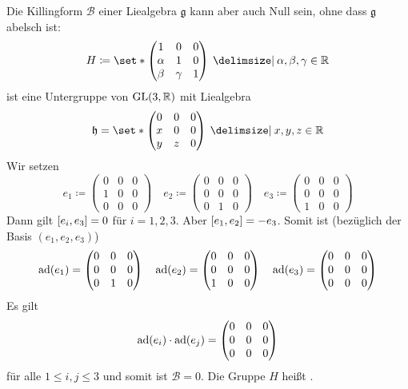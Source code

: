 Die Killingform $\mathcal{B}$ einer Liealgebra $\mathfrak{g}$ kann aber auch Null sein, ohne dass $\mathfrak{g}$ abelsch ist: 
\[
	H \coloneqq \set*{\begin{pmatrix}
		1 & 0 & 0 \\
		\alpha & 1 & 0 \\
		\beta & \gamma & 1
	\end{pmatrix} \given \alpha,\beta,\gamma \in \mathbb{R}}
\]
ist eine Untergruppe von $\GL(3,\mathbb{R})$ mit Liealgebra
\[
	\mathfrak{h} = \set*{\begin{pmatrix}
		0 & 0 & 0 \\
		x & 0 & 0 \\
		y & z & 0
	\end{pmatrix} \given x,y,z \in \mathbb{R}}
\]
Wir setzen 
\[
	e_1 \coloneqq \begin{pmatrix}
		0 & 0 & 0 \\
		1 & 0 & 0 \\
		0 & 0 & 0
	\end{pmatrix} \quad 
	e_2 \coloneqq \begin{pmatrix}
		0 & 0 & 0 \\
		0 & 0 & 0 \\
		0 & 1 & 0
	\end{pmatrix} \quad 
	e_3 \coloneqq \begin{pmatrix}
		0 & 0 & 0 \\
		0 & 0 & 0 \\
		1 & 0 & 0
	\end{pmatrix}
\]
Dann gilt $\benbrace*{e_i,e_3} = 0$ für $i=1,2,3$.
Aber $\benbrace*{e_1,e_2}=-e_3$.
Somit ist (bezüglich der Basis $(e_1,e_2,e_3)$)
\[
	\ad(e_1) = \begin{pmatrix}
		0 & 0 & 0 \\
		0 & 0 & 0 \\
		0 & 1 & 0
	\end{pmatrix} \quad 
	\ad(e_2) = \begin{pmatrix}
		0 & 0 & 0 \\
		0 & 0 & 0 \\
		1 & 0 & 0 
	\end{pmatrix} \quad 
	\ad(e_3) = \begin{pmatrix}
		0 & 0 & 0 \\
		0 & 0 & 0 \\
		0 & 0 & 0
	\end{pmatrix}
\]
Es gilt
\[
	\ad(e_i) \cdot \ad(e_j) = \begin{pmatrix}
		0 & 0 & 0 \\
		0 & 0 & 0 \\
		0 & 0 & 0
	\end{pmatrix}
\]
für alle $1 \le i,j \le 3$ und somit ist $\mathcal{B}=0$.
Die Gruppe $H$ heißt . 


